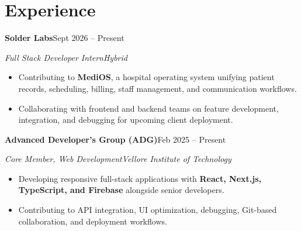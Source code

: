 \documentclass[letterpaper,11pt]{article}
\newcommand{\entry}[4]{%
  \textbf{#1}\hfill #2\par
  \textit{#3}\hfill\textit{#4}\par}
\begin{document}
\section{Experience}
\entry{Solder Labs}{Sept 2026 -- Present}{Full Stack Developer Intern}{Hybrid}
\begin{itemize}
  \item Contributing to \textbf{MediOS}, a hospital operating system unifying patient records, scheduling, billing, staff management, and communication workflows.
  \item Collaborating with frontend and backend teams on feature development, integration, and debugging for upcoming client deployment.
\end{itemize}
\vspace{2pt}
\entry{Advanced Developer's Group (ADG)}{Feb 2025 -- Present}{Core Member, Web Development}{Vellore Institute of Technology}
\begin{itemize}
  \item Developing responsive full-stack applications with \textbf{React, Next.js, TypeScript, and Firebase} alongside senior developers.
  \item Contributing to API integration, UI optimization, debugging, Git-based collaboration, and deployment workflows.
\end{itemize}
\end{document}

